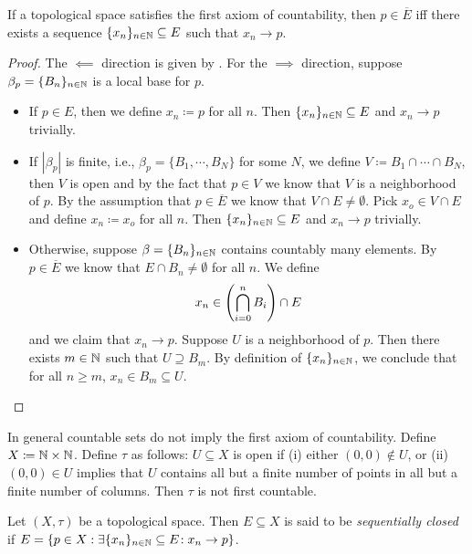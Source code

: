 \documentclass{techreport}
\begin{document}
\begin{lemma}\label{Lem:FirstCountLimitOfSeqIffClosure}
	If a topological space satisfies the first axiom of countability, then $p \in \overline{E}$ iff there exists a sequence $\{x_n\}_{n \in \mathbb{N}} \subseteq E$ such that $x_n \rightarrow p$.
\end{lemma}
\begin{proof}
	The ${\impliedby}$ direction is given by .
	For the ${\implies}$ direction, suppose $\beta_p = \{B_n\}_{n \in \mathbb{N}}$ is a local base for $p$.
	\begin{itemize}
		\item If $p \in E$, then we define $x_n \coloneqq p$ for all $n$.
		Then $\{x_n\}_{n \in \mathbb{N}} \subseteq E$ and $x_n \rightarrow p$ trivially.
		\item If $|\beta_p|$ is finite, i.e., $\beta_p = \{B_1,\cdots,B_N\}$ for some $N$, we define $V \coloneqq B_1 \cap \cdots \cap B_N$, then $V$ is open and by the fact that $p \in V$ we know that $V$ is a neighborhood of $p$.
			By the assumption that $p \in \overline{E}$ we know that $V \cap E \neq \emptyset$.
			Pick $x_o \in V \cap E$ and define $x_n \coloneqq x_o$ for all $n$.
			Then $\{x_n\}_{n \in \mathbb{N}} \subseteq E$ and $x_n \rightarrow p$ trivially.
		\item Otherwise, suppose $\beta=\{B_n\}_{n \in \mathbb{N}}$ contains countably many elements.
			By $p \in \overline{E}$ we know that $E \cap B_n \neq \emptyset$ for all $n$.
			We define
			\[
			x_n \in \left({ \bigcap_{i=0}^n B_i }\right) \cap E
			\]
			and we claim that $x_n \rightarrow p$.
			Suppose $U$ is a neighborhood of $p$.
			Then there exists $m \in \mathbb{N}$ such that $U \supseteq B_m$.
			By definition of $\{x_n\}_{n \in \mathbb{N}}$, we conclude that for all $n \ge m$, $x_n \in B_m \subseteq U$.
	\end{itemize}
\end{proof}

\begin{example}\label{Exa:CountableNotImplyFstCountable}
	In general countable sets do not imply the first axiom of countability.
	Define $X \coloneqq \mathbb{N} \times \mathbb{N}$.
	Define $\tau$ as follows: $U \subseteq X$ is open if (i) either $(0,0) \not\in U$, or (ii) $(0,0) \in U$ implies that $U$ contains all but a finite number of points in all but a finite number of columns.
	Then $\tau$ is not first countable.
\end{example}

\begin{definition}\label{De:SequentiallyClosed}
	Let $(X,\tau)$ be a topological space.
	Then $E \subseteq X$ is said to be \emph{sequentially closed} if $E = \{ p \in X : \exists {\{x_n\}_{n \in \mathbb{N}} \subseteq E }\!: x_n \rightarrow p \}$.
\end{definition}
\end{document}
